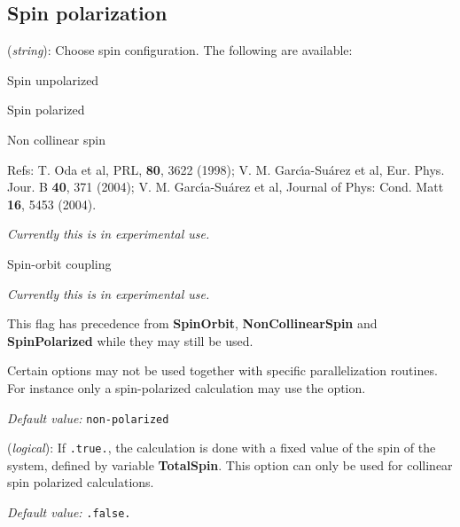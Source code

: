 \vspace{5pt}
\subsection{Spin polarization}

\begin{description}
\itemsep 10pt
\parsep 0pt

\item[\textbf{Spin}] (\textit{string}):
Choose spin configuration. The following are available:
\begin{description}
\itemsep 2pt
\parsep 0pt
\small
\item[non-polarized] Spin unpolarized

\item[polarized] Spin polarized

\item[non-collinear] Non collinear spin

Refs: T. Oda et al, PRL, \textbf{80}, 3622 (1998); 
V. M. Garc\'{\i}a-Su\'arez et al, Eur. Phys. Jour. B \textbf{40}, 371 (2004);
V. M. Garc\'{\i}a-Su\'arez et al, Journal of
Phys: Cond. Matt \textbf{16}, 5453 (2004).

\emph{Currently this is in experimental use.}

\item[spin-orbit] Spin-orbit coupling

\emph{Currently this is in experimental use.}
\end{description}

This flag has precedence from \textbf{SpinOrbit}, \textbf{NonCollinearSpin} and
\textbf{SpinPolarized} while they may still be used.

Certain options may not be used together with specific parallelization routines.
For instance only a spin-polarized calculation may use the 
option. 

\textit{Default value:} \texttt{non-polarized}

\item[\textbf{FixSpin}] (\textit{logical}):
If \texttt{.true.}, the calculation is done with a fixed value of the
spin of the system, defined by variable  \textbf{TotalSpin}.
This option can only be used for collinear spin polarized
calculations.

\textit{Default value:} \texttt{.false.}


\end{description}
